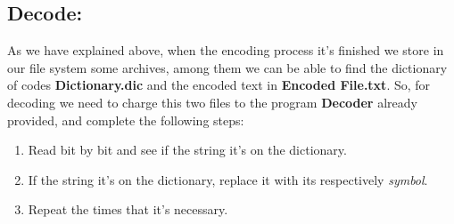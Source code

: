 \subsection{Decode:}

As we have explained above, when the encoding process it's finished we store in our file system some archives, among them we can be able to find the dictionary of codes {\bfseries Dictionary.dic} and the encoded text in {\bfseries Encoded File.txt}. So, for decoding we need to charge this two files to the program {\bfseries Decoder} already provided, and complete the following steps:

\begin{enumerate}
\item Read bit by bit and see if the string it's on the dictionary.
\item If the string it's on the dictionary, replace it with its respectively {\itshape symbol}.
\item Repeat the times that it's necessary.
\end{enumerate}
